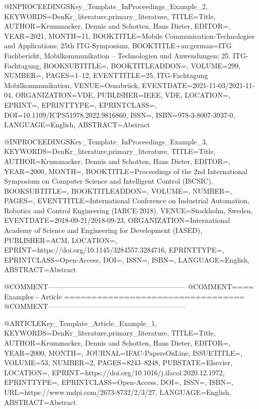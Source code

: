 @INPROCEEDINGS{Key_Template_InProceedings_Example_2,
    KEYWORDS={DenKr_literature,primary_literature},
    TITLE={\begingroup
        {Title}\endgroup},
    AUTHOR={Krummacker, Dennis and Schotten, Hans Dieter},
    EDITOR={},
    YEAR={2021},
    MONTH={11},
    BOOKTITLE={Mobile Communication-Technologies and Applications; 25th ITG-Symposium},
    BOOKTITLE+an:german={ITG Fachbericht, Mobilkommunikation -- Technologien und Anwendungen; 25. ITG-Fachtagung},
    BOOKSUBTITLE={},
    BOOKTITLEADDON={},
    VOLUME={299},
    NUMBER={},
    PAGES={1--12},
    EVENTTITLE={25. ITG-Fachtagung Mobilkommunikation},
    VENUE={Osnabr{\"u}ck},
    EVENTDATE={2021-11-03/2021-11-04},
    ORGANIZATION={VDE},
    PUBLISHER={IEEE, VDE},
    LOCATION={},
    EPRINT={},
    EPRINTTYPE={},
    EPRINTCLASS={},
    DOI={10.1109/ICPS51978.2022.9816860},
    ISSN={},
    ISBN={978-3-8007-3937-0},
    LANGUAGE={English},
    ABSTRACT={\begingroup
        {Abstract}\endgroup}
}

@INPROCEEDINGS{Key_Template_InProceedings_Example_3,
    KEYWORDS={DenKr_literature,primary_literature},
    TITLE={\begingroup
        {Title}\endgroup},
    AUTHOR={Krummacker, Dennis and Schotten, Hans Dieter},
    EDITOR={},
    YEAR={2000},
    MONTH={},
    BOOKTITLE={Proceedings of the 2nd International Symposium on Computer Science and Intelligent Control (ISCSIC)},
    BOOKSUBTITLE={},
    BOOKTITLEADDON={},
    VOLUME={},
    NUMBER={},
    PAGES={},
    EVENTTITLE={International Conference on Industrial Automation, Robotics and Control Engineering (IARCE-2018)},
    VENUE={Stockholm, Sweden},
    EVENTDATE={2018-09-21/2018-09-23},
    ORGANIZATION={International Academy of Science and Engineering for Development (IASED)},
    PUBLISHER={ACM},
    LOCATION={},
    EPRINT={https://doi.org/10.1145/3284557.3284716},
    EPRINTTYPE={},
    EPRINTCLASS={Open-Access},
    DOI={},
    ISSN={},
    ISBN={},
    LANGUAGE={English},
    ABSTRACT={\begingroup
        {Abstract}\endgroup}
}



@COMMENT{-----------------------------------------------------------}
@COMMENT{====  Examples - Article  =================================}
@COMMENT{-----------------------------------------------------------}

@ARTICLE{Key_Template_Article_Example_1,
    KEYWORDS={DenKr_literature,primary_literature},
    TITLE={\begingroup
        {Title}\endgroup},
    AUTHOR={Krummacker, Dennis and Schotten, Hans Dieter},
    EDITOR={},
    YEAR={2000},
    MONTH={},
    JOURNAL={IFAC-PapersOnLine},
    ISSUETITLE={},
    VOLUME={53},
    NUMBER={2},
    PAGES={8243--8248},
    PUBSTATE={Elsevier},
    LOCATION={},
    EPRINT={https://doi.org/10.1016/j.ifacol.2020.12.1972},
    EPRINTTYPE={},
    EPRINTCLASS={Open-Access},
    DOI={},
    ISSN={},
    ISBN={},
    URL={https://www.mdpi.com/2673-8732/2/3/27},
    LANGUAGE={English},
    ABSTRACT={\begingroup
        {Abstract}\endgroup}
}

